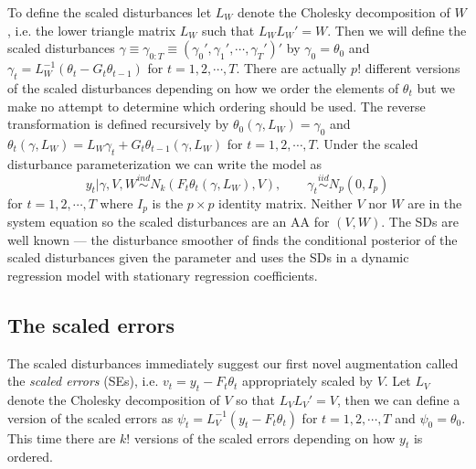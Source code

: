 \documentclass[12pt]{article}
\begin{document}
To define the scaled disturbances let $L_W$ denote the Cholesky decomposition of $W$, i.e. the lower triangle matrix $L_W$ such that $L_WL_W' =W$. Then we will define the scaled disturbances $\gamma\equiv\gamma_{0:T}\equiv(\gamma_0',\gamma_1',\cdots,\gamma_T')'$ by $\gamma_0=\theta_0$ and $\gamma_t = L_W^{-1}(\theta_t-G_t\theta_{t-1})$ for $t=1,2,\cdots,T$. There are actually $p!$ different versions of the scaled disturbances depending on how we order the elements of $\theta_t$ \citep{meng1998fast} but we make no attempt to determine which ordering should be used. The reverse transformation is defined recursively by $\theta_0(\gamma,L_W)=\gamma_0$ and $\theta_t(\gamma,L_W)=L_W\gamma_t + G_t\theta_{t-1}(\gamma,L_W)$ for $t=1,2,\cdots,T$. Under the scaled disturbance parameterization we can write the model as
\begin{equation}
  y_t|\gamma,V,W  \stackrel{ind}{\sim} N_k\left(F_t\theta_t(\gamma,L_W), V\right), \qquad
  \gamma_t  \stackrel{iid}{\sim}N_p(0,I_p) \label{dlmdistmodel}
\end{equation}
for $t=1,2,\cdots,T$ where $I_p$ is the $p\times p$ identity matrix. Neither $V$ nor $W$ are in the system equation so the scaled disturbances are an AA for $(V,W)$. The SDs are well known --- the disturbance smoother of \citet{koopman1993disturbance} finds the conditional posterior of the scaled disturbances given the parameter and \citet{fruhwirth2004efficient} uses the SDs in a dynamic regression model with stationary regression coefficients.

\subsection{The scaled errors}\label{sec:DAs:error}
The scaled disturbances immediately suggest our first novel augmentation called the {\it scaled errors} (SEs), i.e. $v_t=y_t - F_t\theta_t$ appropriately scaled by $V$. Let $L_V$ denote the Cholesky decomposition of $V$ so that $L_VL_V'=V$, then we can define a version of the scaled errors as $\psi_t = L_V^{-1}(y_t - F_t\theta_t)$ for $t=1,2,\cdots,T$ and $\psi_0 = \theta_0$. This time there are $k!$ versions of the scaled errors depending on how $y_t$ is ordered.

\end{document}
